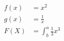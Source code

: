 \documentclass{article}
\begin{document}
	\begin{align*}
		f(x) &= x^2\\
		g(x) &=\frac{1}{x}\\
		F(X) &=\int^a_b \frac{1}{3}x^3
			\end{align*}
\end{document}
